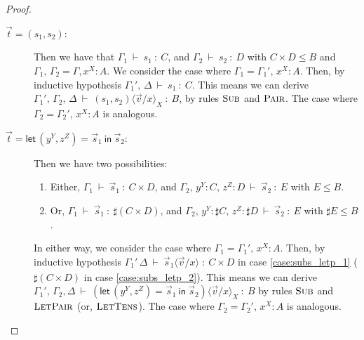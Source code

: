 \documentclass[a4paper,UKenglish,numberwithinsect,pdfa,anonymous]{lipics-v2021}
\theoremstyle{restatestyle}
\newcommand\ansubst[2]{\ensuremath{\langle #1 \rangle_{#2}}}
\def\Pair#1#2{(#1,#2)} %
\def\letkeyword{\mathsf{let}}
\def\inkeyword{\mathsf{in}}
\def\LetP#1#2#3#4#5#6{\letkeyword\,\Pair{#1^{#2}}{#3^{#4}}=#5~\inkeyword~#6}
\def\TYP#1#2#3{#1~{\vdash}~#2~{:}~#3}
\begin{document}
\begin{proof}
\begin{description}
    \item[$\vec{t}=\Pair{s_1}{s_2}$:] Then we have that $\TYP{\Gamma_1}{s_1}{C}$, and $\TYP{\Gamma_2}{s_2}{D}$ with $C\times D\leq B$ and $\Gamma_1,\,\Gamma_2 = \Gamma,x^{X}\!:\!A$. We consider the case where $\Gamma_1 = \Gamma_1',\,x^{X}\!:\!A$. Then, by inductive hypothesis $\TYP{\Gamma_1',\,\Delta}{s_1}{C}$. This means we can derive $\TYP{\Gamma_1',\,\Gamma_2,\,\Delta}{\Pair{s_1}{s_2}\ansubst{\vec{v}/x}{X}}{B}$, by rules $\textsc{Sub}$ and $\textsc{Pair}$. The case where $\Gamma_2 = \Gamma_2',\,x^{X}\!:\!A$ is analogous.
    
    \item[$\vec{t}=\LetP{y}{Y}{z}{Z}{\vec{s}_{1}}{\vec{s}_{2}}$:] Then we have two possibilities:
      \begin{enumerate}
        \item\label{case:subs_letp_1} Either, $\TYP{\Gamma_1}{\vec{s}_{1}}{C\times D}$, and $\TYP{\Gamma_2,\,y^{Y}\!:\!C,\,z^{Z}\!:\!D}{\vec{s}_{2}}{E}$ with $E\leq B$.
        \item\label{case:subs_letp_2} Or, $\TYP{\Gamma_1}{\vec{s}_{1}}{\sharp(C\times D)}$, and $\TYP{\Gamma_2,\,y^{Y}\!:\!\sharp{C},\,z^{Z}\!:\!\sharp{D}}{\vec{s}_{2}}{E}$ with $\sharp E\leq B$.
      \end{enumerate}
      In either way, we consider the case where $\Gamma_1 = \Gamma_1',\,x^{X}\!:\!A$. Then, by inductive hypothesis $\TYP{\Gamma_1'\,\Delta}{\vec{s}_{1}\ansubst{\vec{v}/x}{}}{C\times D}$ in case \ref{case:subs_letp_1} ($\sharp (C\times D)$ in case \ref{case:subs_letp_2}). This means we can derive $\TYP{\Gamma_1',\,\Gamma_2,\Delta}{(\LetP{y}{Y}{z}{Z}{\vec{s}_{1}}{\vec{s}_{2}})\ansubst{\vec{v}/x}{X}}{B}$ by rules $\textsc{Sub}$ and $\textsc{LetPair}$ (or, $\textsc{LetTens}$). The case where $\Gamma_2 = \Gamma_2',\,x^{X}\!:\!A$ is analogous.


\end{description}
\end{proof}
\end{document}
